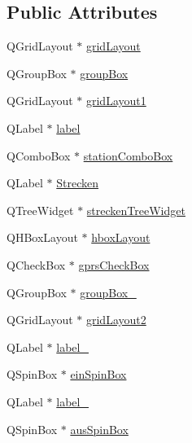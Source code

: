 \subsection*{Public Attributes}
\begin{CompactItemize}
\item 
QGridLayout $\ast$ \hyperlink{class_ui___hardware_konfiguration_class_f77589838837011c6f5963606e294811}{gridLayout}
\item 
QGroupBox $\ast$ \hyperlink{class_ui___hardware_konfiguration_class_b2b7603199a9bcd3eee88a1bc21cfce3}{groupBox}
\item 
QGridLayout $\ast$ \hyperlink{class_ui___hardware_konfiguration_class_1e1dc8c73f659958294e814098429c48}{gridLayout1}
\item 
QLabel $\ast$ \hyperlink{class_ui___hardware_konfiguration_class_03ccc259e2085a6124a83518674a5a6a}{label}
\item 
QComboBox $\ast$ \hyperlink{class_ui___hardware_konfiguration_class_167dcb3e915d3baa57057e640ad0436e}{stationComboBox}
\item 
QLabel $\ast$ \hyperlink{class_ui___hardware_konfiguration_class_7d350559025b3702ce89ec8d4f69baec}{Strecken}
\item 
QTreeWidget $\ast$ \hyperlink{class_ui___hardware_konfiguration_class_1548d7d5be705d18b1427a98d7f773ee}{streckenTreeWidget}
\item 
QHBoxLayout $\ast$ \hyperlink{class_ui___hardware_konfiguration_class_370d044e4d30bbce7980dd52733764ab}{hboxLayout}
\item 
QCheckBox $\ast$ \hyperlink{class_ui___hardware_konfiguration_class_4324c232d41bd325d7acfa566e5f466a}{gprsCheckBox}
\item 
QGroupBox $\ast$ \hyperlink{class_ui___hardware_konfiguration_class_99b6adc09321ce48551fcf4ef623aec5}{groupBox\_}
\item 
QGridLayout $\ast$ \hyperlink{class_ui___hardware_konfiguration_class_73a4a8b67ed70c1ea98f4141a010b034}{gridLayout2}
\item 
QLabel $\ast$ \hyperlink{class_ui___hardware_konfiguration_class_495a69b871217df346fb62fe64da1927}{label\_}
\item 
QSpinBox $\ast$ \hyperlink{class_ui___hardware_konfiguration_class_bb2d6d985395acde0ae066f61c1f39d2}{einSpinBox}
\item 
QLabel $\ast$ \hyperlink{class_ui___hardware_konfiguration_class_ebe435becf558ce72d262af64d933ce6}{label\_}
\item 
QSpinBox $\ast$ \hyperlink{class_ui___hardware_konfiguration_class_b6e494df3044deb527985ebd16e99b70}{ausSpinBox}

\end{CompactItemize}
